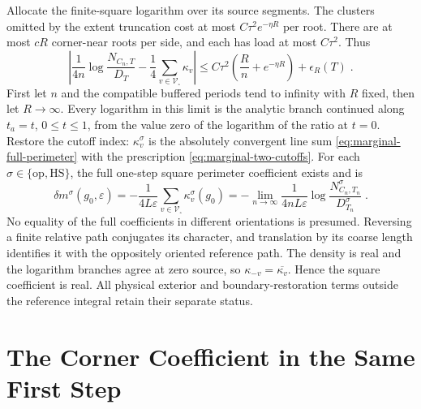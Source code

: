 \documentclass[11pt]{article}
\begin{document}
Allocate the finite-square logarithm over its source segments. The clusters omitted by the extent truncation cost at most $C\tau^2e^{-\eta R}$ per root. There are at most $cR$ corner-near roots per side, and each has load at most $C\tau^2$. Thus
\begin{equation}\label{eq:marginal-buffered-density}
    \left|\frac{1}{4n}\log\frac{N_{C_n,T}}{D_T}
        -\frac{1}{4}\sum_{v\in \mathscr V_\square}\kappa_v\right|
        \leq C\tau^2\left(\frac{R}{n}+e^{-\eta R}\right)
            +\epsilon_R(T)\;.
\end{equation}
First let $n$ and the compatible buffered periods tend to infinity with $R$ fixed, then let $R\to\infty$. Every logarithm in this limit is the analytic branch continued along $t_a=t$, $0\leq t\leq 1$, from the value zero of the logarithm of the ratio at $t=0$. Restore the cutoff index: $\kappa_v^{\sigma}$ is the absolutely convergent line sum \eqref{eq:marginal-full-perimeter} with the prescription \eqref{eq:marginal-two-cutoffs}. For each $\sigma\in \{\mathrm{op},\mathrm{HS}\}$, the full one-step square perimeter coefficient exists and is
\begin{equation}\label{eq:marginal-square-mass}
    \boxed{\displaystyle
        \delta m^{\sigma}(g_0,\varepsilon)
            =-\frac{1}{4L\varepsilon}
                \sum_{v\in \mathscr V_\square}\kappa_v^{\sigma}(g_0)
            =-\lim_{n\to\infty}
                \frac{1}{4nL\varepsilon}
                    \log\frac{N_{C_n,T_n}^{\sigma}}{D_{T_n}^{\sigma}}}
        \;.
\end{equation}
No equality of the full coefficients in different orientations is presumed. Reversing a finite relative path conjugates its character, and translation by its coarse length identifies it with the oppositely oriented reference path. The density is real and the logarithm branches agree at zero source, so $\kappa_{-v}=\overline{\kappa_v}$. Hence the square coefficient is real. All physical exterior and boundary-restoration terms outside the reference integral retain their separate status.

\section{The Corner Coefficient in the Same First Step}
\label{sec:marginal-corner}
\end{document}
